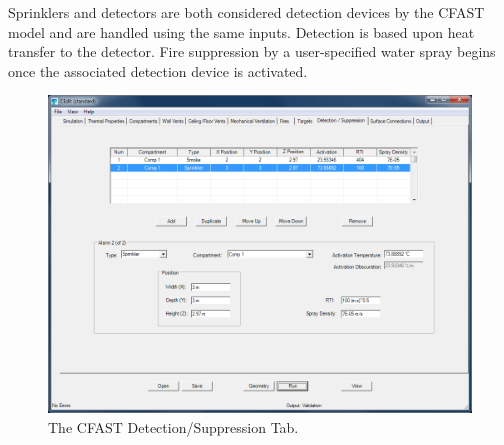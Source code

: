 Sprinklers and detectors are both considered detection devices by the CFAST model and are handled using the same inputs.  Detection is based upon heat transfer to the detector. Fire suppression by a user-specified water spray begins once the associated detection device is activated.

\begin{figure}[h!]
\begin{center}
\includegraphics[width=6.5in]{FIGURES/Detector_Tab}
\caption[The CFAST Detection/Suppression Tab]{The CFAST Detection/Suppression Tab.}
\end{center}
\end{figure}

